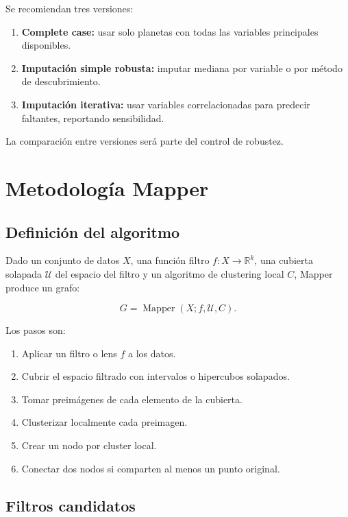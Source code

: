 \documentclass[11pt,letterpaper]{article}
\newcommand{\Mapper}{\operatorname{Mapper}}
\newcommand{\R}{\mathbb{R}}
\begin{document}
Se recomiendan tres versiones:

\begin{enumerate}
    \item \textbf{Complete case:} usar solo planetas con todas las variables principales disponibles.
    \item \textbf{Imputación simple robusta:} imputar mediana por variable o por método de descubrimiento.
    \item \textbf{Imputación iterativa:} usar variables correlacionadas para predecir faltantes, reportando sensibilidad.
\end{enumerate}

La comparación entre versiones será parte del control de robustez.

\section{Metodología Mapper}

\subsection{Definición del algoritmo}

Dado un conjunto de datos $X$, una función filtro $f:X\to\R^k$, una cubierta solapada $\mathcal{U}$ del espacio del filtro y un algoritmo de clustering local $C$, Mapper produce un grafo:

\begin{equation}
G=\Mapper(X;f,\mathcal{U},C).
\end{equation}

Los pasos son:

\begin{enumerate}
    \item Aplicar un filtro o lens $f$ a los datos.
    \item Cubrir el espacio filtrado con intervalos o hipercubos solapados.
    \item Tomar preimágenes de cada elemento de la cubierta.
    \item Clusterizar localmente cada preimagen.
    \item Crear un nodo por cluster local.
    \item Conectar dos nodos si comparten al menos un punto original.
\end{enumerate}

\subsection{Filtros candidatos}
\end{document}
